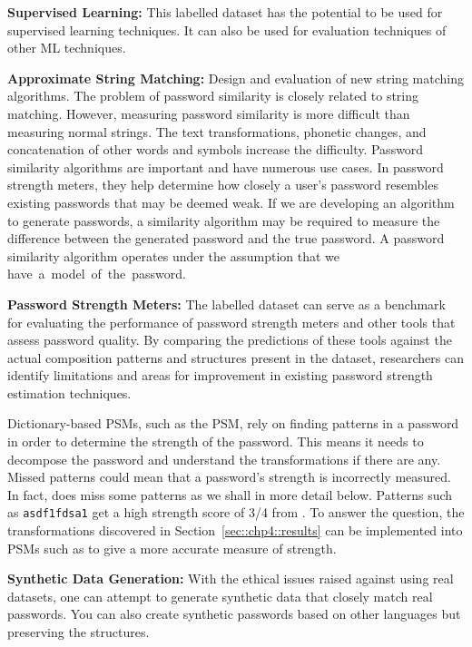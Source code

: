 \textbf{Supervised Learning:} This labelled dataset has the potential to be used for supervised learning techniques. It can also be used for evaluation techniques of other ML techniques.

\textbf{Approximate String Matching:} Design and evaluation of new string matching algorithms. The problem of password similarity is closely related to string matching. However, measuring password similarity is more difficult than measuring normal strings. The text transformations, phonetic changes, and concatenation of other words and symbols increase the difficulty. Password similarity algorithms are important and have numerous use cases. In password strength meters, they help determine how closely a user’s password resembles existing passwords that may be deemed weak. If we are developing an algorithm to generate passwords, a similarity algorithm may be required to measure the difference between the generated password and the true password. A password similarity algorithm operates under the assumption that we have~a~model~of~the~password.

\textbf{Password Strength Meters:} The labelled dataset can serve as a benchmark for evaluating the performance of password strength meters and other tools that assess password quality. By comparing the predictions of these tools against the actual composition patterns and structures present in the dataset, researchers can identify limitations and areas for improvement in existing password strength estimation techniques.

Dictionary-based PSMs, such as the \zxcvbn PSM, rely on finding patterns in a password in order to determine the strength of the password. This means it needs to decompose the password and understand the transformations if there are any. Missed patterns could mean that a password's strength is incorrectly measured. In fact, \zxcvbn does miss some patterns as we shall in more detail below. Patterns such as \texttt{asdf1fdsa1} \cite{noauthor_password_nodate} get a high strength score of 3/4 from \zxcvbn. To answer the question, the transformations discovered in Section~\ref{sec::chp4::results} can be implemented into PSMs such as \zxcvbn to give a more accurate measure of strength.

\textbf{Synthetic Data Generation:} With the ethical issues raised against using real datasets, one can attempt to generate synthetic data that closely match real passwords. You can also create synthetic passwords based on other languages but preserving the structures.

